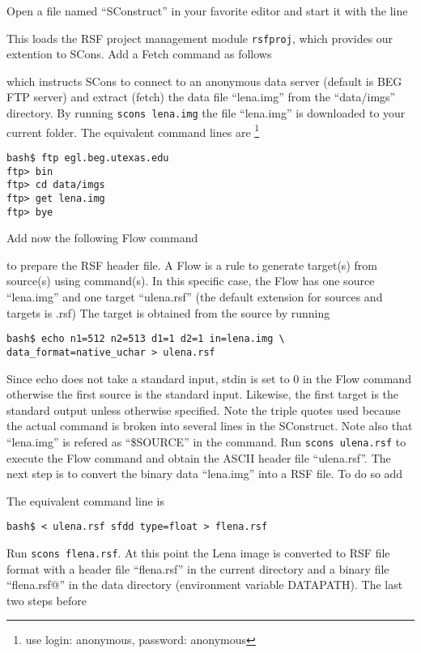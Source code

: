 Open a file named ``SConstruct'' in your favorite editor and start it
with the line
%

%
This loads the RSF project management module \texttt{rsfproj}, which
provides our extention to SCons.
%
Add a Fetch command as follows

which instructs SCons to connect to an anonymous data server (default
is BEG FTP server) and extract (fetch) the data file ``lena.img'' from
the ``data/imgs'' directory. By running \texttt{scons lena.img}
%
the file ``lena.img'' is downloaded to your current folder. The
equivalent command lines are \footnote{use login: anonymous, password:
  anonymous}
\begin{verbatim}
bash$ ftp egl.beg.utexas.edu
ftp> bin
ftp> cd data/imgs
ftp> get lena.img
ftp> bye
\end{verbatim}
%
Add now the following Flow command
%

%
to prepare the RSF header file. A Flow is a rule to generate target(s)
from source(s) using command(s). In this specific case, the Flow has
one source ``lena.img'' and one target ``ulena.rsf'' (the default
extension for sources and targets is .rsf) The target is obtained from
the source by running
%
\begin{verbatim}
bash$ echo n1=512 n2=513 d1=1 d2=1 in=lena.img \
data_format=native_uchar > ulena.rsf
\end{verbatim}
%
Since echo does not take a standard input, stdin is set to 0 in the
Flow command otherwise the first source is the standard input.
Likewise, the first target is the standard output unless otherwise
specified. Note the triple quotes used because the actual command is
broken into several lines in the SConstruct. Note also that
``lena.img'' is refered as ``\$SOURCE'' in the command. Run
\texttt{scons ulena.rsf} to execute the Flow command and obtain the
ASCII header file ``ulena.rsf''.  The next step is to convert the
binary data ``lena.img'' into a RSF file.  To do so add
%

%
The equivalent command line is
%
\begin{verbatim}
bash$ < ulena.rsf sfdd type=float > flena.rsf
\end{verbatim}
%
Run \texttt{scons flena.rsf}. At this point the Lena image is
converted to RSF file format with a header file ``flena.rsf'' in the
current directory and a binary file ``flena.rsf@'' in the data
directory (environment variable DATAPATH). The last two steps before
